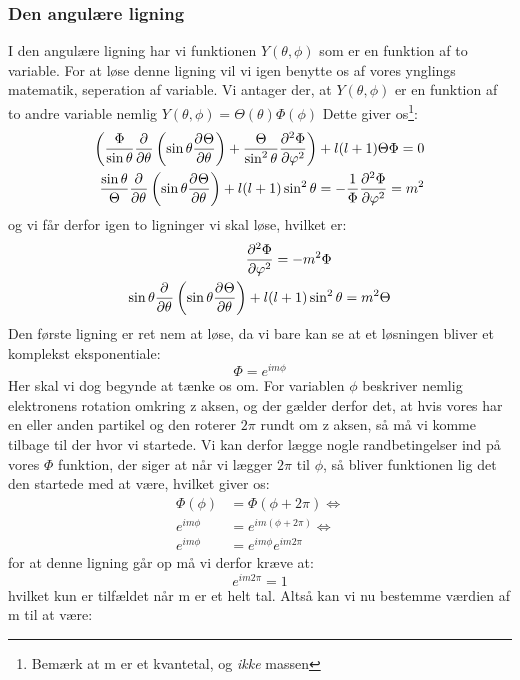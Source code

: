 \documentclass[../../Atom-ogMolekylefysik.tex]{subfiles}
\begin{document}
\subsubsection*{Den angulære ligning}
I den angulære ligning har vi funktionen $Y(\theta,\phi)$ som er en funktion af to variable. For at løse denne ligning vil vi igen benytte os af vores ynglings matematik, seperation af variable. Vi antager der, at $Y(\theta,\phi)$ er en funktion af to andre variable nemlig $Y(\theta,\phi)=\Theta(\theta)\Phi(\phi)$ Dette giver os\footnote{Bemærk at m er et kvantetal, og {\em ikke} massen}:
\begin{align*}
    \left(\frac{\Phi}{\sin\theta}\pdif{\theta}{}\left(\sin \theta\pdif{\theta}{\Theta}\right)+\frac{\Theta}{\sin^2\theta}\pdif[2]{\phi}{\Phi}\right)+l(l+1)\Theta\Phi=0\\
\frac{\sin{\theta}}{\Theta}\pdif{\theta}{}\left(\sin{\theta\pdif{\theta}{\Theta}}\right)+l(l+1)\sin^2\theta=-\frac{1}{\Phi}\pdif[2]{\phi}{\Phi}=m^2
\end{align*}
og vi får derfor igen to ligninger vi skal løse, hvilket er:
\begin{align*}
    \pdif[2]{\phi}{\Phi}&=-m^2\Phi\\
    \sin{\theta}\pdif{\theta}{}\left(\sin{\theta\pdif{\theta}{\Theta}}\right)+l(&l+1)\sin^2\theta=m^2\Theta
\end{align*}
Den første ligning er ret nem at løse, da vi bare kan se at et løsningen bliver et komplekst eksponentiale:
\begin{equation}
    \Phi=e^{im\phi}
\end{equation}
Her skal vi dog begynde at tænke os om. For variablen $\phi$ beskriver nemlig elektronens rotation omkring z aksen, og der gælder derfor det, at hvis vores har en eller anden partikel og den roterer $2\pi$ rundt om z aksen, så må vi komme tilbage til der hvor vi startede. Vi kan derfor lægge nogle randbetingelser ind på vores $\Phi$ funktion, der siger at når vi lægger $2\pi$ til $\phi$, så bliver funktionen lig det den startede med at være, hvilket giver os:
\begin{align*}
    \Phi(\phi)&=\Phi(\phi+2\pi)\iff\\
    e^{im\phi}&=e^{im(\phi+2\pi)}\iff\\
    e^{im\phi}&=e^{im\phi}e^{im2\pi}
\end{align*}
for at denne ligning går op må vi derfor kræve at:
\begin{equation*}
    e^{im2\pi}=1
\end{equation*}
hvilket kun er tilfældet når m er et helt tal. Altså kan vi nu bestemme værdien af m til at være:
\end{document}
